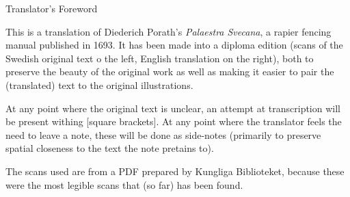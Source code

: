 {\large Translator's Foreword}

This is a translation of Diederich Porath's {\it Palaestra Svecana}, a rapier fencing manual published in 1693. It has been made into a diploma edition (scans of the Swedish original text o the left, English translation on the right), both to preserve the beauty of the original work as well as making it easier to pair the (translated) text to the original illustrations.

At any point where the original text is unclear, an attempt at transcription will be present withing [square brackets]. At any point where the translator feels the need to leave a note, these will be done as side-notes (primarily to preserve spatial closeness to the text the note pretains to).

The scans used are from a PDF prepared by Kungliga Biblioteket, because these were the most legible scans that (so far) has been found.

